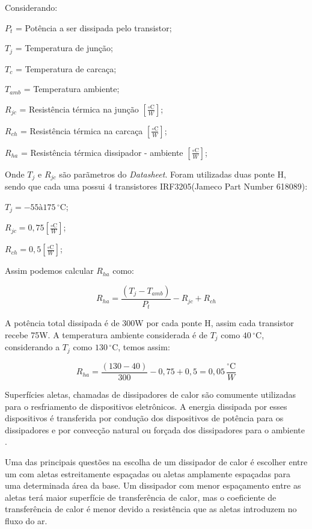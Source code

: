Considerando:

$P_t$ = Potência a ser dissipada pelo transistor;

$T_j$ = Temperatura de junção;

$T_c$ = Temperatura de carcaça;

$T_{amb}$ = Temperatura ambiente;

$R_{jc}$ = Resistência térmica na junção $[\frac{{\circ}\mathrm{C}}{W}]$;

$R_{ch}$ = Resistência térmica na carcaça $[\frac{{\circ}\mathrm{C}}{W}]$;

$R_{ha}$ = Resistência térmica dissipador - ambiente $[\frac{{\circ}\mathrm{C}}{W}]$;

Onde $T_j$ e $R_{jc}$ são parãmetros do \textit{Datasheet}. Foram utilizadas duas ponte H, sendo
que cada uma possui 4 transistores IRF3205(Jameco Part Number 618089)\cite{jameco}:

$T_j = -55 à 175\,^{\circ}\mathrm{C}$;

$R_{jc} = 0,75[\frac{{\circ}\mathrm{C}}{W}]$;

$R_{ch} = 0,5[\frac{{\circ}\mathrm{C}}{W}]$;

Assim podemos calcular $R_{ha}$ como:

\begin{equation}
 R_{ha} = \frac{(T_j - T_{amb})}{P_t} - R_{jc} + R_{ch}
\end{equation}

A potência total dissipada é de 300W por cada ponte H, assim cada transistor recebe 75W. A
temperatura ambiente considerada é de $T_j$ como $40\,^{\circ}\mathrm{C}$, considerando a $T_j$ como $130\,^{\circ}\mathrm{C}$,
temos assim:

\begin{equation}
 R_{ha} = \frac{(130 - 40)}{300} - 0,75 + 0,5 = 0,05\,\frac{^{\circ}\mathrm{C}}{{W}}
\end{equation}

Superfícies aletas, chamadas de dissipadores de calor são
comumente utilizadas para o resfriamento de dispositivos eletrônicos. A energia dissipada por
esses dispositivos é transferida por condução dos dispositivos de potência para os dissipadores
e por convecção natural ou forçada dos dissipadores para o ambiente \cite[p.~434-439]{cengel}.

Uma das principais questões na escolha de um dissipador de calor é escolher entre um com
aletas estreitamente espaçadas ou aletas amplamente espaçadas para uma determinada área
da base. Um dissipador com menor espaçamento entre as aletas terá maior superfície de
transferência de calor, mas o coeficiente de transferência de calor é menor devido a
resistência que as aletas introduzem no fluxo do ar.


